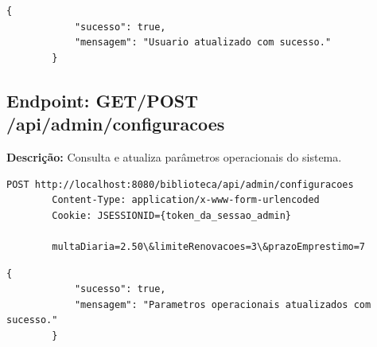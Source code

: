 	\begin{lstlisting}[style=sqlStyle, caption={Resposta esperada (HTTP 200 OK)}]
		{
			"sucesso": true,
			"mensagem": "Usuario atualizado com sucesso."
		}
	\end{lstlisting}
	
	\subsection{Endpoint: GET/POST /api/admin/configuracoes}
	
	\textbf{Descrição:} Consulta e atualiza parâmetros operacionais do sistema.
	
	\begin{lstlisting}[style=sqlStyle, caption={Requisição: POST /api/admin/configuracoes}]
		POST http://localhost:8080/biblioteca/api/admin/configuracoes
		Content-Type: application/x-www-form-urlencoded
		Cookie: JSESSIONID={token_da_sessao_admin}
		
		multaDiaria=2.50\&limiteRenovacoes=3\&prazoEmprestimo=7
	\end{lstlisting}
	
	\begin{lstlisting}[style=sqlStyle, caption={Resposta esperada (HTTP 200 OK)}]
		{
			"sucesso": true,
			"mensagem": "Parametros operacionais atualizados com sucesso."
		}
	\end{lstlisting}
